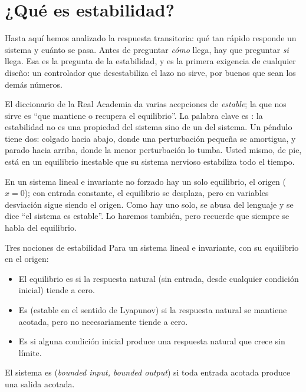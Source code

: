 \section{¿Qué es estabilidad?}
\label{sec:es-concepto}

Hasta aquí hemos analizado la respuesta transitoria: qué tan rápido responde un sistema y cuánto se pasa. Antes de preguntar \emph{cómo} llega, hay que preguntar \emph{si} llega. Esa es la pregunta de la estabilidad, y es la primera exigencia de cualquier diseño: un controlador que desestabiliza el lazo no sirve, por buenos que sean los demás números.

El diccionario de la Real Academia da varias acepciones de \emph{estable}; la que nos sirve es ``que mantiene o recupera el equilibrio''. La palabra clave es : la estabilidad no es una propiedad del sistema sino de un  del sistema. Un péndulo tiene dos: colgado hacia abajo, donde una perturbación pequeña se amortigua, y parado hacia arriba, donde la menor perturbación lo tumba. Usted mismo, de pie, está en un equilibrio inestable que su sistema nervioso estabiliza todo el tiempo.

En un sistema lineal e invariante no forzado hay un solo equilibrio, el origen ($x=0$); con entrada constante, el equilibrio se desplaza, pero en variables desviación sigue siendo el origen. Como hay uno solo, se abusa del lenguaje y se dice ``el sistema es estable''. Lo haremos también, pero recuerde que siempre se habla del equilibrio.

\begin{definicion}[label=def:es-estabilidad]{Tres nociones de estabilidad}
Para un sistema lineal e invariante, con su equilibrio en el origen:
\begin{itemize}
  \item El equilibrio es  si la respuesta natural (sin entrada, desde cualquier condición inicial) tiende a cero.
  \item Es  (estable en el sentido de Lyapunov) si la respuesta natural se mantiene acotada, pero no necesariamente tiende a cero.
  \item Es  si alguna condición inicial produce una respuesta natural que crece sin límite.
\end{itemize}
El sistema es  (\emph{bounded input, bounded output}) si toda entrada acotada produce una salida acotada.
\end{definicion}

